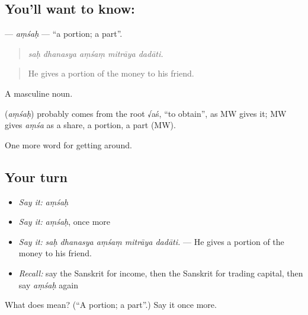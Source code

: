 \subsection*{You'll want to know: }
\textbf{} — \emph{aṃśaḥ} — \textquotedblleft{}a portion; a part\textquotedblright{}.

\begin{quote}
    
\end{quote}

\begin{quote}
\emph{saḥ dhanasya aṃśaṃ mitrāya dadāti.}
\end{quote}

\begin{quote}
He gives a portion of the money to his friend.
\end{quote}

A masculine noun.

\begin{cousinweb}
\textbf{} (\emph{aṃśaḥ}) probably comes from the root √aś, \textquotedblleft{}to obtain\textquotedblright{}, as MW gives it; MW gives \emph{aṃśa} as a share, a portion, a part (MW).
\end{cousinweb}

\begin{grammarlens}[title={What you've built}]
One more word for getting around.
\end{grammarlens}

\subsection*{Your turn}
\begin{itemize}
\raggedright
  \item \emph{Say it:} \emph{aṃśaḥ}
  \item \emph{Say it:} \emph{aṃśaḥ}, once more
  \item \emph{Say it:} \emph{saḥ dhanasya aṃśaṃ mitrāya dadāti.} — He gives a portion of the money to his friend.
  \item \emph{Recall:} say the Sanskrit for income, then the Sanskrit for trading capital, then say \emph{aṃśaḥ} again
\end{itemize}

\begin{tcolorbox}[breakable,colback=teal!4,colframe=teal!35!black,title={Before you move on}]
What does  mean? (\textquotedblleft{}A portion; a part\textquotedblright{}.) Say it once more.
\end{tcolorbox}
